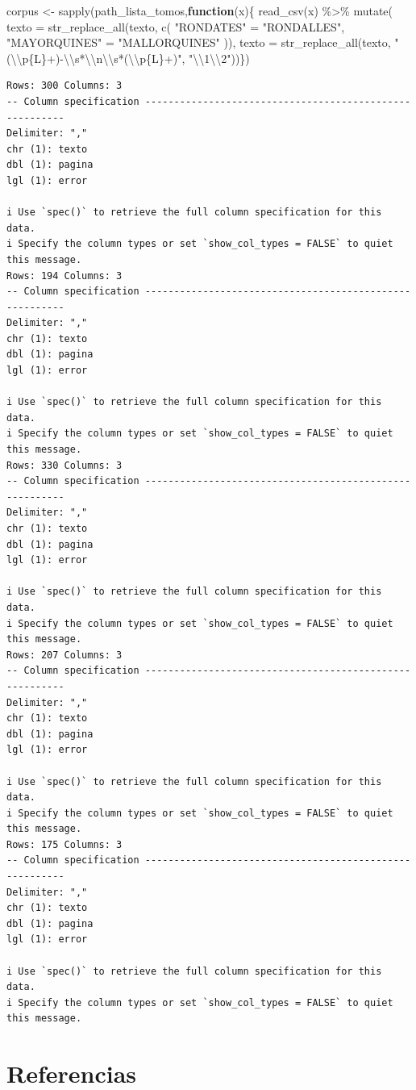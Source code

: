 \documentclass[
  letterpaper,
  DIV=11,
  numbers=noendperiod]{scrreprt}
\newenvironment{Shaded}{\begin{snugshade}}{\end{snugshade}}
\newcommand{\AttributeTok}[1]{\textcolor[rgb]{0.40,0.45,0.13}{#1}}
\newcommand{\ControlFlowTok}[1]{\textcolor[rgb]{0.00,0.23,0.31}{\textbf{#1}}}
\newcommand{\FunctionTok}[1]{\textcolor[rgb]{0.28,0.35,0.67}{#1}}
\newcommand{\NormalTok}[1]{\textcolor[rgb]{0.00,0.23,0.31}{#1}}
\newcommand{\OtherTok}[1]{\textcolor[rgb]{0.00,0.23,0.31}{#1}}
\newcommand{\SpecialCharTok}[1]{\textcolor[rgb]{0.37,0.37,0.37}{#1}}
\newcommand{\StringTok}[1]{\textcolor[rgb]{0.13,0.47,0.30}{#1}}
\begin{document}
\begin{Shaded}
\begin{Highlighting}[]
\NormalTok{corpus }\OtherTok{\textless{}{-}} \FunctionTok{sapply}\NormalTok{(path\_lista\_tomos,}\ControlFlowTok{function}\NormalTok{(x)\{ }\FunctionTok{read\_csv}\NormalTok{(x) }\SpecialCharTok{\%\textgreater{}\%} \FunctionTok{mutate}\NormalTok{(}
    \AttributeTok{texto =} \FunctionTok{str\_replace\_all}\NormalTok{(texto, }\FunctionTok{c}\NormalTok{(}
    \StringTok{"RONDATES"} \OtherTok{=} \StringTok{"RONDALLES"}\NormalTok{,}
      \StringTok{"MAYORQUINES"} \OtherTok{=} \StringTok{"MALLORQUINES"}
\NormalTok{    )),}
    \AttributeTok{texto =} \FunctionTok{str\_replace\_all}\NormalTok{(texto, }\StringTok{"(}\SpecialCharTok{\textbackslash{}\textbackslash{}}\StringTok{p\{L\}+){-}}\SpecialCharTok{\textbackslash{}\textbackslash{}}\StringTok{s*}\SpecialCharTok{\textbackslash{}\textbackslash{}}\StringTok{n}\SpecialCharTok{\textbackslash{}\textbackslash{}}\StringTok{s*(}\SpecialCharTok{\textbackslash{}\textbackslash{}}\StringTok{p\{L\}+)"}\NormalTok{, }\StringTok{"}\SpecialCharTok{\textbackslash{}\textbackslash{}}\StringTok{1}\SpecialCharTok{\textbackslash{}\textbackslash{}}\StringTok{2"}\NormalTok{))\}) }
\end{Highlighting}
\end{Shaded}

\begin{verbatim}
Rows: 300 Columns: 3
-- Column specification --------------------------------------------------------
Delimiter: ","
chr (1): texto
dbl (1): pagina
lgl (1): error

i Use `spec()` to retrieve the full column specification for this data.
i Specify the column types or set `show_col_types = FALSE` to quiet this message.
Rows: 194 Columns: 3
-- Column specification --------------------------------------------------------
Delimiter: ","
chr (1): texto
dbl (1): pagina
lgl (1): error

i Use `spec()` to retrieve the full column specification for this data.
i Specify the column types or set `show_col_types = FALSE` to quiet this message.
Rows: 330 Columns: 3
-- Column specification --------------------------------------------------------
Delimiter: ","
chr (1): texto
dbl (1): pagina
lgl (1): error

i Use `spec()` to retrieve the full column specification for this data.
i Specify the column types or set `show_col_types = FALSE` to quiet this message.
Rows: 207 Columns: 3
-- Column specification --------------------------------------------------------
Delimiter: ","
chr (1): texto
dbl (1): pagina
lgl (1): error

i Use `spec()` to retrieve the full column specification for this data.
i Specify the column types or set `show_col_types = FALSE` to quiet this message.
Rows: 175 Columns: 3
-- Column specification --------------------------------------------------------
Delimiter: ","
chr (1): texto
dbl (1): pagina
lgl (1): error

i Use `spec()` to retrieve the full column specification for this data.
i Specify the column types or set `show_col_types = FALSE` to quiet this message.
\end{verbatim}


\chapter{Referencias}\label{referencias}
\end{document}
